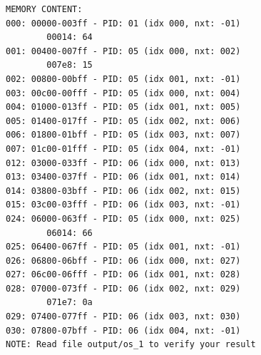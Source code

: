 \documentclass[a4paper]{article}
\numberwithin{equation}{section}
\begin{document}
\begin{mdframed}[leftline=false,rightline=false,backgroundcolor=teal!10,nobreak=false]
\begin{verbatim}
MEMORY CONTENT:
000: 00000-003ff - PID: 01 (idx 000, nxt: -01)
        00014: 64
001: 00400-007ff - PID: 05 (idx 000, nxt: 002)
        007e8: 15
002: 00800-00bff - PID: 05 (idx 001, nxt: -01)
003: 00c00-00fff - PID: 05 (idx 000, nxt: 004)
004: 01000-013ff - PID: 05 (idx 001, nxt: 005)
005: 01400-017ff - PID: 05 (idx 002, nxt: 006)
006: 01800-01bff - PID: 05 (idx 003, nxt: 007)
007: 01c00-01fff - PID: 05 (idx 004, nxt: -01)
012: 03000-033ff - PID: 06 (idx 000, nxt: 013)
013: 03400-037ff - PID: 06 (idx 001, nxt: 014)
014: 03800-03bff - PID: 06 (idx 002, nxt: 015)
015: 03c00-03fff - PID: 06 (idx 003, nxt: -01)
024: 06000-063ff - PID: 05 (idx 000, nxt: 025)
        06014: 66
025: 06400-067ff - PID: 05 (idx 001, nxt: -01)
026: 06800-06bff - PID: 06 (idx 000, nxt: 027)
027: 06c00-06fff - PID: 06 (idx 001, nxt: 028)
028: 07000-073ff - PID: 06 (idx 002, nxt: 029)
        071e7: 0a
029: 07400-077ff - PID: 06 (idx 003, nxt: 030)
030: 07800-07bff - PID: 06 (idx 004, nxt: -01)
NOTE: Read file output/os_1 to verify your result
  \end{verbatim}
\end{mdframed}
\end{document}
